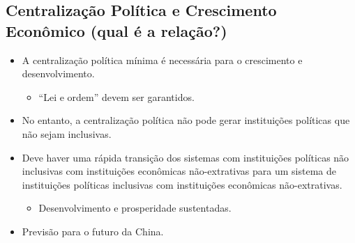 \documentclass[a4paper,12pt]{article}[abntex2]
\begin{document}
\subsection{\textbf{Centralização Política e Crescimento Econômico (qual é a relação?)}}
\begin{itemize}
    \item A centralização política mínima é necessária para o crescimento e desenvolvimento.\begin{itemize}
        \item “Lei e ordem” devem ser garantidos.
    \end{itemize}
    \item No entanto, a centralização política não pode gerar instituições políticas que não sejam inclusivas. 
    \item Deve haver uma rápida transição dos sistemas com instituições políticas não inclusivas com instituições econômicas não-extrativas para um sistema de instituições políticas inclusivas com instituições econômicas não-extrativas.\begin{itemize}
        \item Desenvolvimento e prosperidade sustentadas. 
    \end{itemize}
    \item Previsão para o futuro da China. 
\end{itemize}
\end{document}
